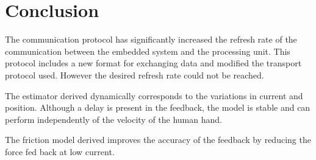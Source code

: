 \chapter{Conclusion}\label{cha:conclusion}

The communication protocol has significantly increased the refresh rate of the communication between the embedded system and the processing unit. This protocol includes a new format for exchanging data and modified the transport protocol used. However the desired refresh rate could not be reached.

The estimator derived dynamically corresponds to the variations in current and position. Although a delay is present in the feedback, the model is stable and can perform independently of the velocity of the human hand.

The friction model derived improves the accuracy of the feedback by reducing the force fed back at low current.